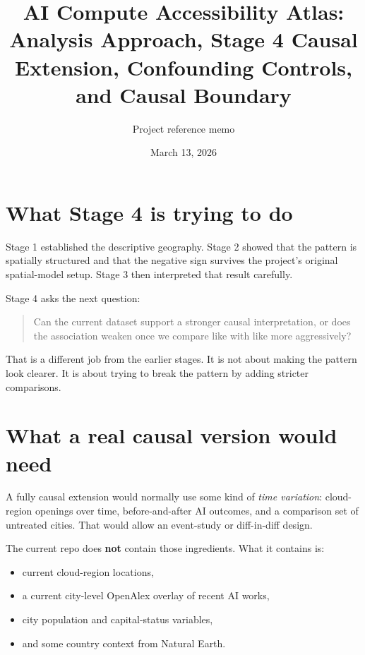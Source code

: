 \documentclass[11pt]{article}
\title{\textbf{AI Compute Accessibility Atlas:}\\
\large Analysis Approach, Stage 4 Causal Extension, Confounding Controls, and Causal Boundary}
\author{Project reference memo}
\date{March 13, 2026}
\begin{document}
\maketitle

\begin{center}
\end{center}

\section{What Stage 4 is trying to do}
Stage 1 established the descriptive geography. Stage 2 showed that the pattern is spatially structured and that the negative sign survives the project's original spatial-model setup. Stage 3 then interpreted that result carefully.

Stage 4 asks the next question:
\begin{quote}
Can the current dataset support a stronger causal interpretation, or does the association weaken once we compare like with like more aggressively?
\end{quote}

That is a different job from the earlier stages. It is not about making the pattern look clearer. It is about trying to break the pattern by adding stricter comparisons.

\section{What a real causal version would need}
A fully causal extension would normally use some kind of \emph{time variation}: cloud-region openings over time, before-and-after AI outcomes, and a comparison set of untreated cities. That would allow an event-study or diff-in-diff design.

The current repo does \textbf{not} contain those ingredients. What it contains is:
\begin{itemize}[leftmargin=*]
    \item current cloud-region locations,
    \item a current city-level OpenAlex overlay of recent AI works,
    \item city population and capital-status variables,
    \item and some country context from Natural Earth.
\end{itemize}
\end{document}
